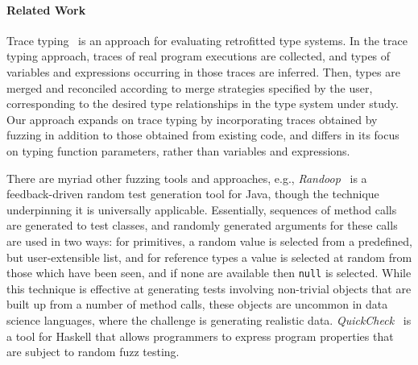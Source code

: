 \documentclass[sigplan,anonymous,review]{acmart}
\begin{document}

\paragraph{Related Work}
Trace typing~\cite{andreasen2016trace} is an approach for evaluating retrofitted type systems.
In the trace typing approach, traces of real program executions are collected, and types of variables and expressions occurring in those traces are inferred.
Then, types are merged and reconciled according to merge strategies specified by the user, corresponding to the desired type relationships in the type system under study.
Our approach expands on trace typing by incorporating traces obtained by fuzzing in addition to those obtained from existing code, and differs in its focus on typing function parameters, rather than variables and expressions.

There are myriad other fuzzing tools and approaches, e.g., \emph{Randoop}~\cite{pacheco2007randoop} is a feedback-driven random test generation tool for Java, though the technique underpinning it is universally applicable.
Essentially, sequences of method calls are generated to test classes, and randomly generated arguments for these calls are used in two ways: for primitives, a random value is selected from a predefined, but user-extensible list, and for reference types a value is selected at random from those which have been seen, and if none are available then {\tt null} is selected.
While this technique is effective at generating tests involving non-trivial objects that are built up from a number of method calls, these objects are uncommon in data science languages, where the challenge is generating realistic data.
\emph{QuickCheck}~\cite{quickcheck} is a tool for Haskell that allows programmers to express program properties that are subject to random fuzz testing.



\end{document}

